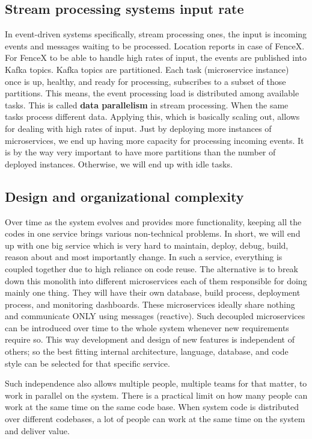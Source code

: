 \documentclass[a4]{report}
\begin{document}
    \subsection{Stream processing systems input rate}
    In event-driven systems specifically, stream processing ones, the input is incoming events and messages waiting to
    be processed.
    Location reports in case of FenceX.
    For FenceX to be able to handle high rates of input, the events are published into Kafka topics.
    Kafka topics are partitioned.
    Each task (microservice instance) once is up, healthy, and ready for processing, subscribes to a subset of those
    partitions.
    This means, the event processing load is distributed among available tasks.
    This is called \textbf{data parallelism} in stream processing.
    When the same tasks process different data.
    Applying this, which is basically scaling out, allows for dealing with high rates of input.
    Just by deploying more instances of microservices, we end up having more capacity for processing incoming events.
    It is by the way very important to have more partitions than the number of deployed instances.
    Otherwise, we will end up with idle tasks.

    \subsection{Design and organizational complexity}
    Over time as the system evolves and provides more functionality, keeping all the codes in one service brings various
    non-technical problems.
    In short, we will end up with one big service which is very hard to maintain, deploy, debug, build, reason about
    and most importantly change.
    In such a service, everything is coupled together due to high reliance on code reuse.
    The alternative is to break down this monolith into different microservices each of them responsible for doing mainly one thing.
    They will have their own database, build process, deployment process, and monitoring dashboards.
    These microservices ideally share nothing and communicate ONLY using messages (reactive).
    Such decoupled microservices can be introduced over time to the whole system whenever new requirements require so.
    This way development and design of new features is independent of others;
    so the best fitting internal architecture, language, database, and code style can be selected for that specific service.

    Such independence also allows multiple people, multiple teams for that matter, to work in parallel on the system.
    There is a practical limit on how many people can work at the same time on the same code base.
    When system code is distributed over different codebases, a lot of people can work at the same time on the system and deliver value.
\end{document}
